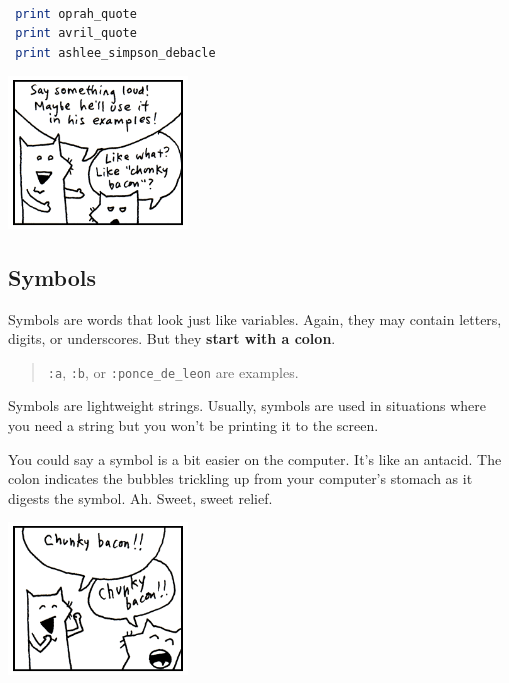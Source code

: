 \documentclass[10pt,twoside]{report}
\begin{document}
\begin{lstlisting}[basicstyle=\ttfamily\color{basiccolor},
    commentstyle = \ttfamily\color{commentcolor},
    keywordstyle=\ttfamily\color{keywordscolor},
    stringstyle=\color{stringcolor},
    language=Ruby,
    basicstyle=\small\ttfamily,
    showstringspaces=false,
  ]

 print oprah_quote
 print avril_quote
 print ashlee_simpson_debacle

\end{lstlisting}


	\includegraphics[width=0.3575\textwidth]{cache/9.png}




\subsection{Symbols}



Symbols are words that look just like variables.  Again, they may
contain letters, digits, or underscores.  But they {\bf start with a
  colon}.

\begin{quote}
\lstinline[breaklines=true]|:a|, \lstinline[breaklines=true]|:b|, or
\lstinline[breaklines=true]|:ponce_de_leon| are examples.\end{quote}


Symbols are lightweight strings.  Usually, symbols are used in
situations where you need a string but you won't be printing it to the
screen.

You could say a symbol is a bit easier on the computer.  It's like an
antacid.  The colon indicates the bubbles trickling up from your
computer's stomach as it digests the symbol.  Ah.  Sweet, sweet
relief.

	\includegraphics[width=0.3575\textwidth]{cache/10.png}
\end{document}
